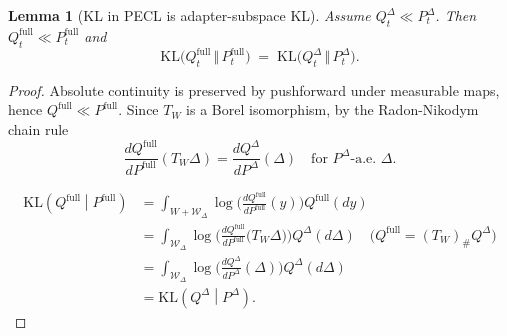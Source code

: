 \documentclass{article}
\theoremstyle{plain}
\newtheorem{lemma}[theorem]{Lemma}
\theoremstyle{definition}
\theoremstyle{remark}
\begin{document}

\begin{lemma}[KL in PECL is adapter-subspace KL]
Assume $Q_t^\Delta \ll P_t^\Delta$. Then $Q_t^{\mathrm{full}} \ll P_t^{\mathrm{full}}$ and
$$
\mathrm{KL}\bigl(Q_t^{\mathrm{full}} \,\Vert\, P_t^{\mathrm{full}}\bigr)
\;=\;
\mathrm{KL}\bigl(Q_t^\Delta \,\Vert\, P_t^\Delta\bigr).
$$
\end{lemma}

\begin{proof}
  Absolute continuity is preserved by pushforward under measurable maps, hence $Q^{\mathrm{full}}\ll P^{\mathrm{full}}$. Since $T_W$ is a Borel isomorphism, by the Radon-Nikodym chain rule
 \[
 \frac{dQ^{\mathrm{full}}}{dP^{\mathrm{full}}}(T_W\Delta)=\frac{dQ^{\Delta}}{dP^{\Delta}}(\Delta)\quad\text{for }P^{\Delta}\text{-a.e.\ }\Delta.
 \]

\begin{equation*}
     \begin{aligned}
 \mathrm{KL}\left(Q^{\mathrm{full}}\middle|P^{\mathrm{full}}\right)
 &= \int_{W+\mathcal W_\Delta}
 \log\Big(\frac{dQ^{\mathrm{full}}}{dP^{\mathrm{full}}}(y)\Big)
 Q^{\mathrm{full}}(dy)\\
 &= \int_{\mathcal W_\Delta}
 \log\Big(\frac{dQ^{\mathrm{full}}}{dP^{\mathrm{full}}}\big(T_W\Delta\big)\Big)
 Q^{\Delta}(d\Delta) \quad \text{(} Q^{\mathrm{full}}=(T_W)_{\text{\#}}Q^{\Delta}\text{)} 
 \\
 &= \int_{\mathcal W_\Delta}
 \log\Big(\frac{dQ^{\Delta}}{dP^{\Delta}}(\Delta)\Big)
 Q^{\Delta}(d\Delta) \\
 &= \mathrm{KL}\left(Q^{\Delta}\middle|P^{\Delta}\right).
 \end{aligned}
\end{equation*} 
\end{proof}
\end{document}
